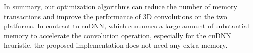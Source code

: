 In summary, our optimization algorithms can reduce the number of memory transactions and improve the performance of 3D convolutions on the two platforms. In contrast to cuDNN, which consumes a large amount of substantial memory to accelerate the convolution operation, especially for the cuDNN heuristic, the proposed implementation does not need any extra memory.

